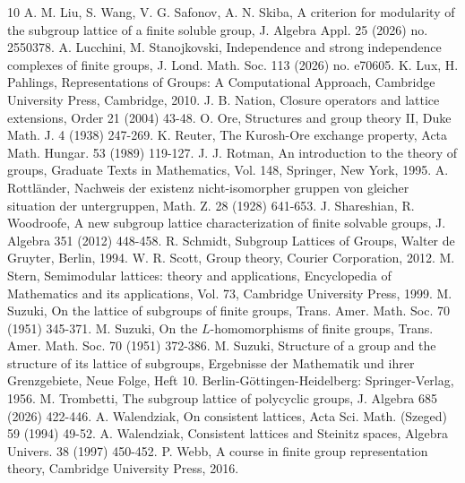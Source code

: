 \documentclass[12pt]{article}
\begin{document}
\begin{thebibliography}{10}
 A. M. Liu, S. Wang, V. G. Safonov, A. N. Skiba, A criterion for modularity of the subgroup lattice of a finite soluble group, J. Algebra Appl. 25 (2026) no. 2550378.
 A. Lucchini, M. Stanojkovski, Independence and strong independence complexes of finite groups, J. Lond. Math. Soc. 113 (2026) no. e70605.
 K. Lux, H. Pahlings, Representations of Groups: A Computational Approach, Cambridge University Press, Cambridge, 2010.
 J. B. Nation, Closure operators and lattice extensions, Order 21 (2004) 43-48.
 O. Ore, Structures and group theory II, Duke Math. J. 4 (1938) 247-269.
 K. Reuter, The Kurosh-Ore exchange property, Acta Math. Hungar. 53 (1989) 119-127.
 J. J. Rotman, An introduction to the theory of groups, Graduate Texts in Mathematics, Vol. 148, Springer, New York, 1995.
 A. Rottl\"{a}nder, Nachweis der existenz nicht-isomorpher gruppen von gleicher situation der untergruppen, Math. Z. 28 (1928) 641-653.
 J. Shareshian, R. Woodroofe, A new subgroup lattice characterization of finite solvable groups, J. Algebra 351 (2012) 448-458.
 R. Schmidt, Subgroup Lattices of Groups, Walter de Gruyter, Berlin, 1994.
 W. R. Scott, Group theory, Courier Corporation, 2012.
 M. Stern, Semimodular lattices: theory and applications, Encyclopedia of Mathematics and its applications, Vol. 73, Cambridge University Press, 1999.
 M. Suzuki, On the lattice of subgroups of finite groups, Trans. Amer. Math. Soc.
70 (1951) 345-371.
 M. Suzuki, On the $L$-homomorphisms of finite groups, Trans. Amer. Math. Soc.
70 (1951) 372-386.
 M. Suzuki, Structure of a group and the structure of its lattice of subgroups, Ergebnisse der Mathematik und ihrer Grenzgebiete, Neue Folge, Heft 10. Berlin-G\"{o}ttingen-Heidelberg:
Springer-Verlag, 1956.
 M. Trombetti, The subgroup lattice of polycyclic groups, J. Algebra 685 (2026) 422-446.
 A. Walendziak, On consistent lattices, Acta Sci. Math. (Szeged) 59 (1994) 49-52.
 A. Walendziak, Consistent lattices and Steinitz spaces, Algebra Univers. 38 (1997) 450-452.
 P. Webb, A course in finite group representation theory, Cambridge University Press, 2016.

\end{thebibliography}
\end{document}
